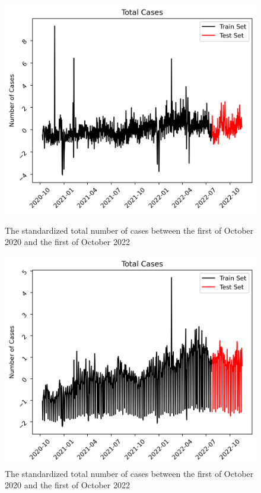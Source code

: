 \begin{figure}
\begin{minipage}{.5\textwidth}
  \centering
  \includegraphics[width=\linewidth]{pics/cases_total_NL.png}
  \caption{The standardized total number of cases between the first of October 2020 and the first of October 2022}
  \label{fig:total cases NL}
\end{minipage}
\begin{minipage}{.5\textwidth}
  \centering
  \includegraphics[width=\linewidth]{pics/cases_total_DE.png}
  \caption{The standardized total number of cases between the first of October 2020 and the first of October 2022}
  \label{fig:total cases DE}
\end{minipage}


\end{figure}
